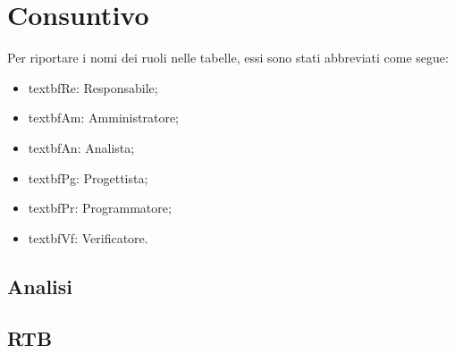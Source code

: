\section{Consuntivo}

Per riportare i nomi dei ruoli nelle tabelle, essi sono stati abbreviati come segue:
\begin{itemize}
  \item textbf{Re:} Responsabile;
  \item textbf{Am:} Amministratore;
  \item textbf{An:} Analista;
  \item textbf{Pg:} Progettista;
  \item textbf{Pr:} Programmatore;
  \item textbf{Vf:} Verificatore.
\end{itemize}

\subsection{Analisi}


\subsection{RTB}


% 

% 

% 

